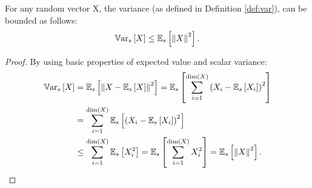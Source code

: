 \begin{lemma}\label{lemma:varineq}
	For any random vector X, the variance (as defined in Definition \ref{def:var}), can be bounded as follows:
	\[
	\Vars{X} \leq \Es{\norm[]{X}^2}.
	\]
\end{lemma}
\begin{proof}
	By using basic properties of expected value and scalar variance:
	\begin{align*}
	\Vars{X} &= \Es{\norm[]{X-\Es{X}}^2} = \Es{\sum_{i=1}^{\dim(X)}\left(X_i-\Es{X_i}\right)^2}\\
	& = \sum_{i=1}^{\dim(X)}\Es{\left(X_i-\Es{X_i}\right)^2} \\
	&\leq \sum_{i=1}^{\dim(X)}\Es{X_i^2} = \Es{\sum_{i=1}^{\dim(X)}X_i^2} = \Es{\norm[]{X}^2}.
	\end{align*}
\end{proof}

